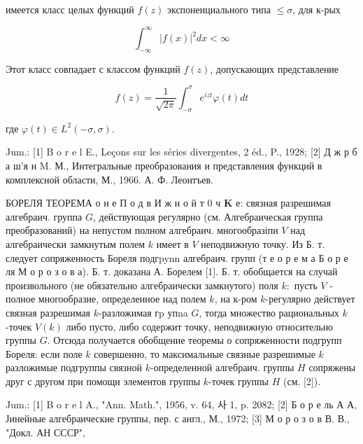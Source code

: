 \documentclass[10pt]{article}
\begin{document}
имеется класс целых функций $f(z)$ экспоненциального типа $\leqslant \sigma$, для к-рых



\[

\int_{-\infty}^{\infty}|f(x)|^{2} d x<\infty

\]



Этот класс совпадает с классом функций $f(z)$, допускающих представление



\[

f(z)=\frac{1}{\sqrt{2 \pi}} \int_{-\sigma}^{\sigma} e^{i z t} \varphi(t) d t

\]



где $\varphi(t) \in L^{2}(-\sigma, \sigma)$.



Jum.: [1] B o r e l E., Leçons sur les séries divergentes, 2 éd., P., 1928; [2] Д ж р б а ш'я н M. М., Интегральные преобразования и представления функций в комплексной области, М., 1966. А. Ф. Леонтъев.



БОРЕЛЯ ТЕОРЕМА о н е П о д в И ж н $о$ й т 0 ч $\boldsymbol{K}$ е: связная разрешимая алгебраич. группа $G$, действующая регулярно (см. Алгебраическая группа преобразований) на непустом полном алгебраич. многообразіпи $V$ над алгебраически замкнутым полем $k$ имеет в $V$ неподвижную точку. Из Б. т. следует сопряженность Бореля подгpynn алгебраич. групп (т е о р е м а Б о р е ля М о р о з о в а). Б. т. доказана А. Борелем [1]. Б. т. обобщается на случай произвольного (не обязательно алгебраически замкнутого) поля $k:$ пусть $V$ - полное многообразие, определенное над полем $k$, на к-ром $k$-регулярно действует связная разрешимая $k$-разложимая гp упna $G$, тогда множество рациональных $k$-точек $V(k)$ либо пусто, либо содержит точку, неподвижную относительно группы $G$. Отсюда получается обобщение теоремы о сопряженности подгрупп Бореля: если поле $k$ совершенно, то максимальные связные разрешимые $k$ разложимые подгруппы связной $k$-определенной алгебраич. группы $H$ сопряжены друг с другом при помощи элементов группы $k$-точек группы $H$ (см. [2]).



Jum.: [1] B o r e l A., "Ann. Math.", 1956, v. 64, 사 1, p. 2082; [2] Б о р е ль А А, Јинейные алгебраические группы, пер. с англ., М., 1972; [3] М о р о з о в В. В., "Докл. АН СССР",
\end{document}
